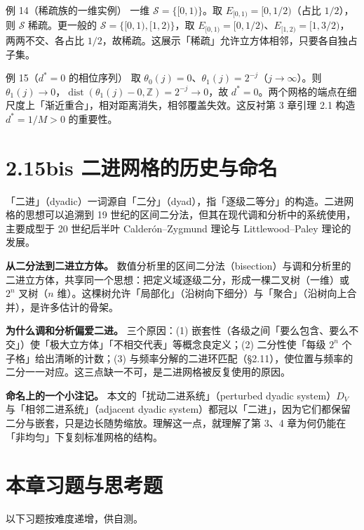 \documentclass[a4paper,11pt,openany]{ctexbook}
\numberwithin{equation}{chapter}
\numberwithin{figure}{chapter}
\numberwithin{table}{chapter}
\begin{document}
\begin{examplebox}{例 14（稀疏族的一维实例）}
一维 $\mathcal S=\{[0,1)\}$。取 $E_{[0,1)}=[0,1/2)$（占比 $1/2$），则 $\mathcal S$ 稀疏。更一般的 $\mathcal S=\{[0,1),[1,2)\}$，取 $E_{[0,1)}=[0,1/2)$、$E_{[1,2)}=[1,3/2)$，两两不交、各占比 $1/2$，故稀疏。这展示「稀疏」允许立方体相邻，只要各自独占子集。
\end{examplebox}

\begin{examplebox}{例 15（$d^*=0$ 的相位序列）}
取 $\theta_0(j)=0$、$\theta_1(j)=2^{-j}$（$j\to\infty$）。则 $\theta_1(j)\to0$，$\operatorname{dist}(\theta_1(j)-0,\mathbb Z)=2^{-j}\to0$，故 $d^*=0$。两个网格的端点在细尺度上「渐近重合」，相对距离消失，相邻覆盖失效。这反衬第 3 章引理 2.1 构造 $d^*=1/M>0$ 的重要性。
\end{examplebox}

\section{2.15bis 二进网格的历史与命名}

「二进」（dyadic）一词源自「二分」（dyad），指「逐级二等分」的构造。二进网格的思想可以追溯到 19 世纪的区间二分法，但其在现代调和分析中的系统使用，主要成型于 20 世纪后半叶 Calderón–Zygmund 理论与 Littlewood–Paley 理论的发展。

\textbf{从二分法到二进立方体。} 数值分析里的区间二分法（bisection）与调和分析里的二进立方体，共享同一个思想：把定义域逐级二分，形成一棵二叉树（一维）或 $2^n$ 叉树（$n$ 维）。这棵树允许「局部化」（沿树向下细分）与「聚合」（沿树向上合并），是许多估计的骨架。

\textbf{为什么调和分析偏爱二进。} 三个原因：(1) 嵌套性（各级之间「要么包含、要么不交」）使「极大立方体」「不相交代表」等概念良定义；(2) 二分性使「每级 $2^n$ 个子格」给出清晰的计数；(3) 与频率分解的二进环匹配（§2.11），使位置与频率的二分一一对应。这三点缺一不可，是二进网格被反复使用的原因。

\textbf{命名上的一个小注记。} 本文的「扰动二进系统」（perturbed dyadic system）$D_V$ 与「相邻二进系统」（adjacent dyadic system）都冠以「二进」，因为它们都保留二分与嵌套，只是边长随势缩放。理解这一点，就理解了第 3、4 章为何仍能在「非均匀」下复刻标准网格的结构。

\section{本章习题与思考题}

以下习题按难度递增，供自测。
\end{document}
